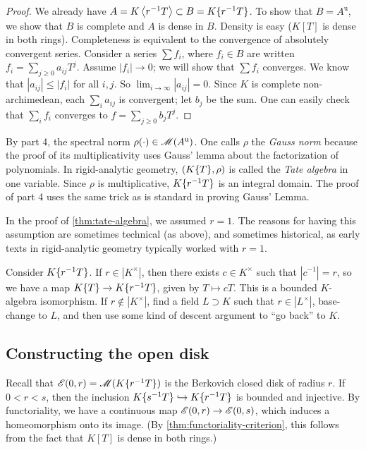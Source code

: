 \begin{proof}
We already have $A=K\left\langle r^{-1} T \right\rangle\subset B=K\{ r^{-1} T \}$. 
To show that $B=A^\mathrm{u}$, we show that $B$ is complete and $A$ is dense in 
$B$. Density is easy ($K[T]$ is dense in both rings). Completeness is 
equivalent to the convergence of absolutely convergent series. Consider a 
series $\sum f_i$, where $f_i\in B$ are written 
$f_i=\sum_{j\geqslant 0} a_{i j} T^j$. Assume $|f_i|\to 0$; we will show that 
$\sum f_i$ converges. We know that $|a_{i j}| \leqslant |f_i|$ for all $i,j$. 
So $\lim_{i\to \infty} |a_{i j}|=0$. Since $K$ is complete non-archimedean, 
each $\sum_i a_{i j}$ is convergent; let $b_j$ be the sum. One can easily 
check that $\sum_i f_i$ converges to $f=\sum_{j\geqslant 0} b_j T^j$. 
\end{proof}

By part 4, the spectral norm $\rho(\cdot)\in \operatorname{\mathscr{M}}(A^\mathrm{u})$. One 
calls $\rho$ the \emph{Gauss norm} because the proof of its multiplicativity 
uses Gauss' lemma about the factorization of polynomials. In rigid-analytic 
geometry, $(K\{ T \},\rho)$ is called the \emph{Tate algebra} in one 
variable. Since $\rho$ is multiplicative, $K\{ r^{-1} T \}$ is an 
integral domain. The proof of part 4 uses the same trick as is standard in 
proving Gauss' Lemma. 

In the proof of \autoref{thm:tate-algebra}, we assumed $r=1$. The reasons for 
having this assumption are sometimes technical (as above), and sometimes 
historical, as early texts in rigid-analytic geometry typically worked with 
$r=1$. 

Consider $K\{ r^{-1} T \}$. If $r\in |K^\times|$, then there exists 
$c\in K^\times$ such that $|c^{-1}|=r$, so we have a map 
$K\{ T \}\to K\{ r^{-1} T \}$, given by $T\mapsto c T$. This is a 
bounded $K$-algebra isomorphism. If $r\notin |K^\times|$, find a field 
$L\supset K$ such that $r\in |L^\times|$, base-change to $L$, and then use some 
kind of descent argument to ``go back'' to $K$. 






\subsection{Constructing the open disk}

Recall that $\mathscr{E}(0,r)=\operatorname{\mathscr{M}}(K\{ r^{-1} T \})$ is the Berkovich closed 
disk of radius $r$. If $0<r<s$, then the inclusion 
$K\{ s^{-1} T \}\hookrightarrow K\{ r^{-1} T \}$ is bounded and 
injective. By functoriality, we have a continuous map $\mathscr{E}(0,r)\to \mathscr{E}(0,s)$, 
which induces a homeomorphism onto its image. (By 
\autoref{thm:functoriality-criterion}, this follows from the fact that $K[T]$ 
is dense in both rings.)

